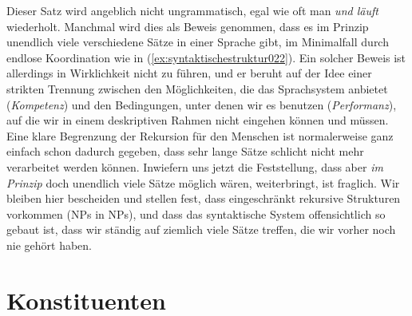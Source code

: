 Dieser Satz wird angeblich nicht ungrammatisch, egal wie oft man \textit{und läuft} wiederholt.
Manchmal wird dies als Beweis genommen, dass es im Prinzip unendlich viele verschiedene Sätze in einer Sprache gibt, im Minimalfall durch endlose Koordination wie in (\ref{ex:syntaktischestruktur022}).
Ein solcher Beweis ist allerdings in Wirklichkeit nicht zu führen, und er beruht auf der Idee einer strikten Trennung zwischen den Möglichkeiten, die das Sprachsystem anbietet (\textit{Kompetenz}) und den Bedingungen, unter denen wir es benutzen (\textit{Performanz}), auf die wir in einem deskriptiven Rahmen nicht eingehen können und müssen.
Eine klare Begrenzung der Rekursion für den Menschen ist normalerweise ganz einfach schon dadurch gegeben, dass sehr lange Sätze schlicht nicht mehr verarbeitet werden können.
Inwiefern uns jetzt die Feststellung, dass aber \textit{im Prinzip} doch unendlich viele Sätze möglich wären, weiterbringt, ist fraglich.
Wir bleiben hier bescheiden und stellen fest, dass eingeschränkt rekursive Strukturen vorkommen (\zB NPs in NPs), und dass das syntaktische System offensichtlich so gebaut ist, dass wir ständig auf ziemlich viele Sätze treffen, die wir vorher noch nie gehört haben.


\section{Konstituenten}
\label{sec:konstituenten}


